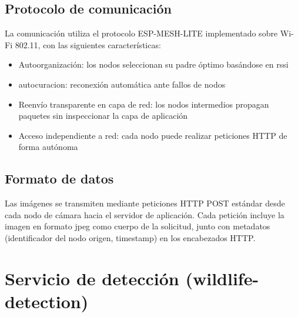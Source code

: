 \documentclass[a4paper, 12pt]{report}
\begin{document}


\subsection{Protocolo de comunicación}

La comunicación utiliza el protocolo \gls{ESP-MESH-LITE} implementado sobre
Wi-Fi 802.11, con las siguientes características:

\begin{itemize}
  \item Autoorganización: los nodos seleccionan su padre óptimo basándose
    en \gls{rssi}
  \item \Gls{autocuracion}: reconexión automática ante fallos de nodos
  \item Reenvío transparente en capa de red: los nodos intermedios propagan
    paquetes sin inspeccionar la capa de aplicación
  \item Acceso independiente a red: cada nodo puede realizar peticiones HTTP
    de forma autónoma
\end{itemize}

\subsection{Formato de datos}

Las imágenes se transmiten mediante peticiones HTTP POST estándar desde cada
nodo de cámara hacia el servidor de aplicación. Cada petición incluye la imagen
en formato \gls{jpeg} como cuerpo de la solicitud, junto con metadatos
(identificador del nodo origen, timestamp) en los encabezados HTTP.

\section{Servicio de detección (wildlife-detection)}
\end{document}
